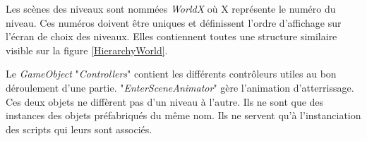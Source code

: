		Les scènes des niveaux sont nommées \textit{WorldX} où X représente le numéro du niveau. Ces numéros doivent être uniques et définissent l'ordre d'affichage sur l'écran de choix des niveaux. Elles contiennent toutes une structure similaire visible sur la figure \ref{HierarchyWorld}.\medskip
		
		\begin{minipage}{\linewidth}
			\label{HierarchyWorld}
		\end{minipage}\medskip
		
		Le \textit{GameObject} "\textit{Controllers}" contient les différents contrôleurs utiles au bon déroulement d'une partie. "\textit{EnterSceneAnimator}" gère l'animation d'atterrissage. Ces deux objets ne diffèrent pas d'un niveau à l'autre. Ils ne sont que des instances des objets préfabriqués du même nom. Ils ne servent qu'à l'instanciation des scripts qui leurs sont associés.
	
